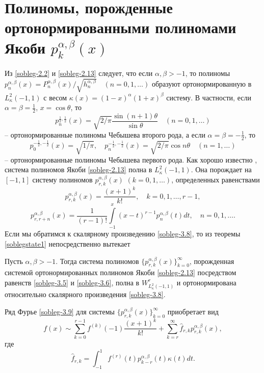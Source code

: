 \section{Полиномы, порожденные  ортонормированными полиномами Якоби $p_{k}^{\alpha,\beta}(x)$}\label{sobleg4}
Из \eqref{sobleg-2.2} и \eqref{sobleg-2.13} следует, что если $\alpha,\beta>-1$, то полиномы $p_n^{\alpha,\beta}(x)=P_n^{\alpha,\beta}(x)/\sqrt{ h_n^{\alpha,\beta}}\quad(n=0,1,\ldots)$
образуют ортонормированную  в $L_\kappa^2(-1,1)$ с весом $\kappa(x)=(1-x)^\alpha(1+x)^\beta$ систему. В частности, если $\alpha=\beta=\frac12$, $x=\cos\theta$, то
$$
 p_n^{\frac12,\frac12}(x)=\sqrt{2/\pi}\frac{\sin(n+1)\theta}{\sin\theta}\quad (n=0,1,\ldots)
 $$
 -- ортонормированные полиномы Чебышева второго рода, а если $\alpha=\beta=-\frac12$, то
\begin{equation}\label{sobleg-3.25}
p_0^{-\frac12,-\frac12}(x)=\sqrt{1/\pi},\quad  p_n^{-\frac12,-\frac12}(x)=\sqrt{2/\pi}\cos n\theta\quad (n=1,\ldots)
\end{equation}
 -- ортонормированные полиномы Чебышева первого рода.
 Как хорошо известно \cite{sobleg-Sege}, система полиномов Якоби \eqref{sobleg-2.13} полна в $L_\kappa^2(-1,1)$.   Она порождает на $[-1,1]$ систему полиномов  $p_{r,k}^{\alpha,\beta}(x)$ $(k=0,1,\ldots)$, определенных равенствами
   \begin{equation}\label{sobleg-3.26}
p_{r,k}^{\alpha,\beta}(x) =\frac{(x+1)^k}{k!}, \quad k=0,1,\ldots, r-1,
\end{equation}
  \begin{equation}\label{sobleg-3.27}
p_{r,r+n}^{\alpha,\beta}(x) =\frac{1}{(r-1)!}\int\limits_{-1}^x(x-t)^{r-1}p_n^{\alpha,\beta}(t)dt, \quad n=0,1,\ldots.
\end{equation}
Если мы обратимся к скалярному произведению \eqref{sobleg-3.8}, то из теоремы \ref{soblegstate1} непосредственно вытекает
\begin{corollary}
Пусть $\alpha,\beta>-1$. Тогда система полиномов $\{p_{r,k}^{\alpha,\beta}(x)\}_{k=0}^\infty$, порожденная системой ортонормированных полиномов Якоби \eqref{sobleg-2.13} посредством равенств \eqref{sobleg-3.5} и \eqref{sobleg-3.6}, полна  в $W^r_{L^2_\kappa(-1,1)}$ и ортонормирована относительно скалярного произведения \eqref{sobleg-3.8}.
\end{corollary}
Ряд Фурье \eqref{sobleg-3.9} для системы   $\{p_{r,k}^{\alpha,\beta}(x)\}_{k=0}^\infty$ приобретает вид
\begin{equation}\label{sobleg-3.28}
f(x)\sim \sum_{k=0}^{r-1} f^{(k)}(-1)\frac{(x+1)^k}{k!}+ \sum_{k=r}^\infty \hat f_{r,k}p_{r,k}^{\alpha,\beta}(x),
\end{equation}
где
  \begin{equation}\label{sobleg-3.29}
 \hat f_{r,k}=\int_{-1}^1 f^{(r)}(t)p_{k-r}^{\alpha,\beta}(t)\kappa(t)dt.
\end{equation}

